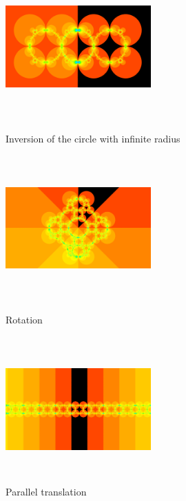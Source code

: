 \begin{figure}[h!tbp]
 \begin{minipage}[t]{0.3\hsize}
  \begin{center}
   \includegraphics[width=2.2in, height=2.2in, keepaspectratio]{../img/klein/2diis/infCircle.pdf}
  \end{center}
  \caption{Inversion of the circle with infinite radius}
  \label{fig:infCircle}
 \end{minipage}
 \hspace*{\fill}
 \begin{minipage}[t]{0.3\hsize}
  \begin{center}
   \includegraphics[width=2.2in, height=2.2in, keepaspectratio]{../img/klein/2diis/rotation.pdf}
  \end{center}
  \caption{Rotation}
  \label{fig:rotation}
 \end{minipage}
 \hspace*{\fill}
 \begin{minipage}[t]{0.3\hsize}
  \begin{center}
   \includegraphics[width=2.2in, height=2.2in, keepaspectratio]{../img/klein/2diis/translation.pdf}
  \end{center}
  \caption{Parallel translation}
  \label{fig:translation2d}
 \end{minipage}
\end{figure}

